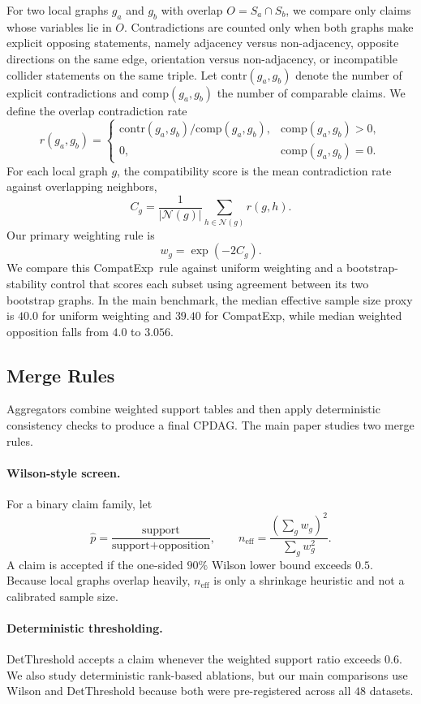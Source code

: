 \documentclass{article}
\newcommand{\method}{CompatExp}
\newcommand{\cpdag}{CPDAG}
\begin{document}
For two local graphs $g_a$ and $g_b$ with overlap $O = S_a \cap S_b$, we compare only claims whose variables lie in $O$. Contradictions are counted only when both graphs make explicit opposing statements, namely adjacency versus non-adjacency, opposite directions on the same edge, orientation versus non-adjacency, or incompatible collider statements on the same triple. Let $\mathrm{contr}(g_a,g_b)$ denote the number of explicit contradictions and $\mathrm{comp}(g_a,g_b)$ the number of comparable claims. We define the overlap contradiction rate
\[
r(g_a,g_b)=
\begin{cases}
\mathrm{contr}(g_a,g_b)/\mathrm{comp}(g_a,g_b), & \mathrm{comp}(g_a,g_b)>0,\\
0, & \mathrm{comp}(g_a,g_b)=0.
\end{cases}
\]
For each local graph $g$, the compatibility score is the mean contradiction rate against overlapping neighbors,
\[
C_g = \frac{1}{|\mathcal{N}(g)|}\sum_{h \in \mathcal{N}(g)} r(g,h).
\]
Our primary weighting rule is
\[
w_g = \exp(-2C_g).
\]
We compare this \method\ rule against uniform weighting and a bootstrap-stability control that scores each subset using agreement between its two bootstrap graphs. In the main benchmark, the median effective sample size proxy is $40.0$ for uniform weighting and $39.40$ for \method, while median weighted opposition falls from $4.0$ to $3.056$.

\subsection{Merge Rules}

Aggregators combine weighted support tables and then apply deterministic consistency checks to produce a final \cpdag. The main paper studies two merge rules.

\paragraph{Wilson-style screen.}
For a binary claim family, let
\[
\hat{p} = \frac{\text{support}}{\text{support}+\text{opposition}},
\qquad
n_{\mathrm{eff}} = \frac{(\sum_g w_g)^2}{\sum_g w_g^2}.
\]
A claim is accepted if the one-sided $90\%$ Wilson lower bound exceeds $0.5$. Because local graphs overlap heavily, $n_{\mathrm{eff}}$ is only a shrinkage heuristic and not a calibrated sample size.

\paragraph{Deterministic thresholding.}
DetThreshold accepts a claim whenever the weighted support ratio exceeds $0.6$. We also study deterministic rank-based ablations, but our main comparisons use Wilson and DetThreshold because both were pre-registered across all $48$ datasets.
\end{document}
